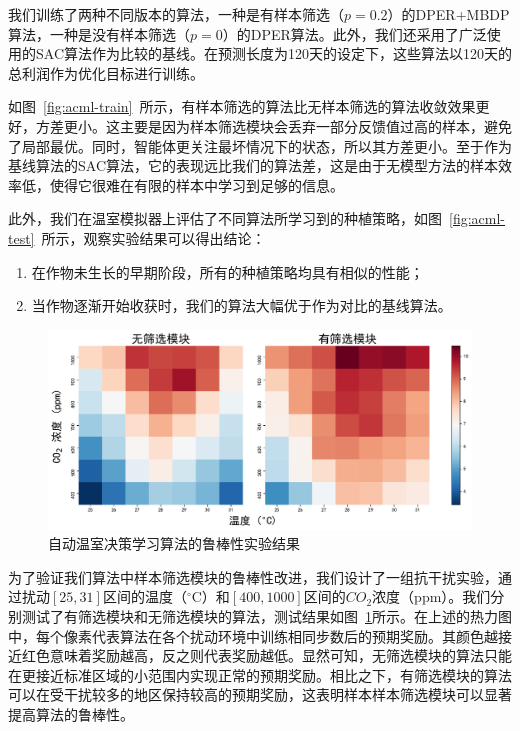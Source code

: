 我们训练了两种不同版本的算法，一种是有样本筛选（$p=0.2$）的DPER+MBDP算法，一种是没有样本筛选（$p=0$）的DPER算法。此外，我们还采用了广泛使用的SAC算法作为比较的基线。在预测长度为120天的设定下，这些算法以120天的总利润作为优化目标进行训练。

如图~\ref{fig:acml-train}~所示，有样本筛选的算法比无样本筛选的算法收敛效果更好，方差更小。这主要是因为样本筛选模块会丢弃一部分反馈值过高的样本，避免了局部最优。同时，智能体更关注最坏情况下的状态，所以其方差更小。至于作为基线算法的SAC算法，它的表现远比我们的算法差，这是由于无模型方法的样本效率低，使得它很难在有限的样本中学习到足够的信息。

此外，我们在温室模拟器上评估了不同算法所学习到的种植策略，如图~\ref{fig:acml-test}~所示，观察实验结果可以得出结论：

\begin{enumerate}
    \item 在作物未生长的早期阶段，所有的种植策略均具有相似的性能；
    \item 当作物逐渐开始收获时，我们的算法大幅优于作为对比的基线算法。
\end{enumerate}

\begin{figure}[ht]
\centering
\includegraphics[width=\textwidth]{figures/robustness-heatmap-for-iros.pdf}
\caption{自动温室决策学习算法的鲁棒性实验结果}
\label{fig:robustness}
\end{figure}

为了验证我们算法中样本筛选模块的鲁棒性改进，我们设计了一组抗干扰实验，通过扰动$[25, 31]$区间的温度（$^\circ$C）和$[400, 1000]$区间的$CO_2$浓度（ppm）。我们分别测试了有筛选模块和无筛选模块的算法，测试结果如图~\ref{fig:robustness}所示。在上述的热力图中，每个像素代表算法在各个扰动环境中训练相同步数后的预期奖励。其颜色越接近红色意味着奖励越高，反之则代表奖励越低。显然可知，无筛选模块的算法只能在更接近标准区域的小范围内实现正常的预期奖励。相比之下，有筛选模块的算法可以在受干扰较多的地区保持较高的预期奖励，这表明样本样本筛选模块可以显著提高算法的鲁棒性。

